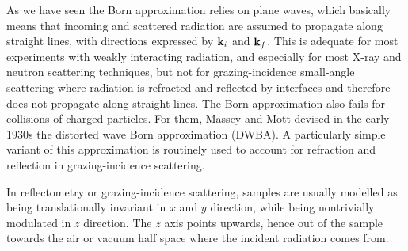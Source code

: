 As we have seen
the Born approximation relies on plane waves,
which basically means that incoming and scattered radiation
are assumed to propagate along straight lines,
with directions expressed by $\mathbf{k}_i$ and $\mathbf{k}_f$.
This is adequate for most experiments with weakly interacting radiation,
and especially for most X-ray and neutron scattering techniques,
but not for grazing-incidence small-angle scattering
where radiation is refracted and reflected by interfaces
and therefore does not propagate along straight lines.
The Born approximation also fails for collisions of charged particles.
For them, Massey and Mott devised in the early 1930s
the distorted wave Born approximation (DWBA).
A particularly simple variant of this approximation
is routinely used to account for refraction and reflection
in grazing-incidence scattering.

In reflectometry or grazing-incidence scattering,
samples are usually modelled as being translationally invariant
in $x$ and $y$ direction,
while being nontrivially modulated in $z$ direction.
The $z$ axis points upwards, hence out of the sample towards the
air or vacuum half space where the incident radiation comes from.

